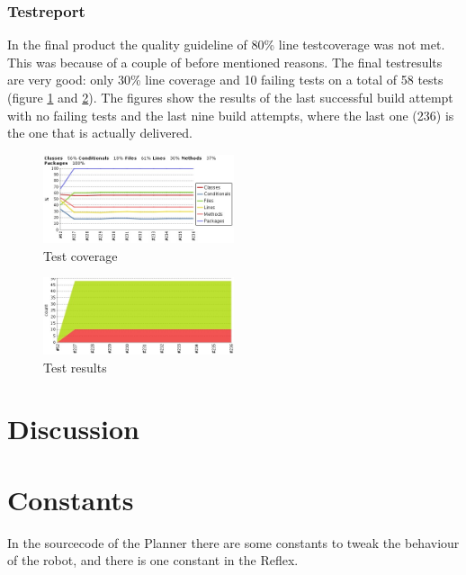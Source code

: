 \documentclass[titlepage, a4paper,10pt]{article}
\begin{document}
\subsubsection{Testreport}
In the final product the quality guideline of 80\% line testcoverage was not met. This was because of a couple of before mentioned reasons. The final testresults are very good: only 30\% line coverage and 10 failing tests on a total of 58 tests (figure \ref{fig:coverage} and \ref{fig:tests}). The figures show the results of the last successful build attempt with no failing tests and the last nine build attempts, where the last one (236) is the one that is actually delivered.

\begin{figure}[h]
  \centering
    \includegraphics[width=0.5\textwidth]{coverage_graph}
  \caption{Test coverage}
  \label{fig:coverage}
\end{figure}

\begin{figure}[h]
  \centering
    \includegraphics[width=0.5\textwidth]{test_graph}
  \caption{Test results}
  \label{fig:tests}
\end{figure}

\newpage

\section{Discussion}


\newpage

\appendix
\appendixpage
\addappheadtotoc
\section{Constants}
In the sourcecode of the Planner there are some constants to tweak the behaviour of the robot, and there is one constant in the Reflex.
\end{document}
